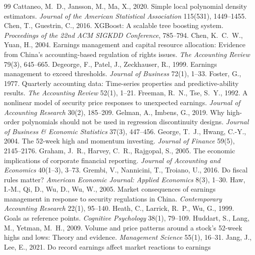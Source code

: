\documentclass[11pt]{article}
\begin{document}
\begin{thebibliography}{99}
 Cattaneo, M.~D., Jansson, M., Ma, X., 2020. Simple local polynomial
density estimators. \emph{Journal of the American Statistical Association} 115(531), 1449--1455.
 Chen, T., Guestrin, C., 2016. XGBoost: A scalable tree boosting system.
\emph{Proceedings of the 22nd ACM SIGKDD Conference}, 785--794.
 Chen, K.~C.~W., Yuan, H., 2004. Earnings management and capital resource
allocation: Evidence from China's accounting-based regulation of rights issues. \emph{The Accounting Review} 79(3),
645--665.
 Degeorge, F., Patel, J., Zeckhauser, R., 1999. Earnings management to
exceed thresholds. \emph{Journal of Business} 72(1), 1--33.
 Foster, G., 1977. Quarterly accounting data: Time-series properties and
predictive-ability results. \emph{The Accounting Review} 52(1), 1--21.
 Freeman, R.~N., Tse, S.~Y., 1992. A nonlinear model of security price
responses to unexpected earnings. \emph{Journal of Accounting Research} 30(2), 185--209.
 Gelman, A., Imbens, G., 2019. Why high-order polynomials should not be
used in regression discontinuity designs. \emph{Journal of Business \& Economic Statistics} 37(3), 447--456.
 George, T.~J., Hwang, C.-Y., 2004. The 52-week high and momentum investing.
\emph{Journal of Finance} 59(5), 2145--2176.
 Graham, J.~R., Harvey, C.~R., Rajgopal, S., 2005. The economic implications of
corporate financial reporting. \emph{Journal of Accounting and Economics} 40(1--3), 3--73.
 Grembi, V., Nannicini, T., Troiano, U., 2016. Do fiscal rules matter?
\emph{American Economic Journal: Applied Economics} 8(3), 1--30.
 Haw, I.-M., Qi, D., Wu, D., Wu, W., 2005. Market consequences of earnings management
in response to security regulations in China. \emph{Contemporary Accounting Research} 22(1), 95--140.
 Heath, C., Larrick, R.~P., Wu, G., 1999. Goals as reference points.
\emph{Cognitive Psychology} 38(1), 79--109.
 Huddart, S., Lang, M., Yetman, M.~H., 2009. Volume and price patterns around
a stock's 52-week highs and lows: Theory and evidence. \emph{Management Science} 55(1), 16--31.
 Jang, J., Lee, E., 2021. Do record earnings affect market reactions to earnings

\end{thebibliography}
\end{document}
